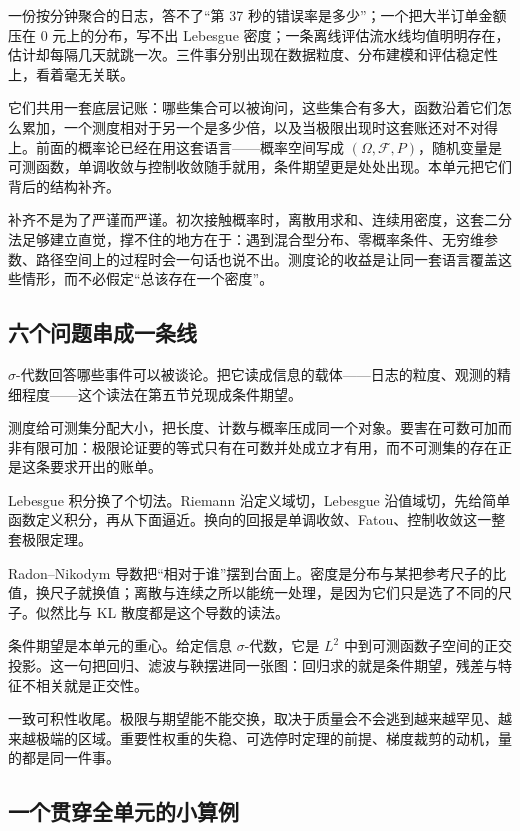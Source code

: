 一份按分钟聚合的日志，答不了``第 37 秒的错误率是多少''；一个把大半订单金额压在 0 元上的分布，写不出 Lebesgue 密度；一条离线评估流水线均值明明存在，估计却每隔几天就跳一次。三件事分别出现在数据粒度、分布建模和评估稳定性上，看着毫无关联。

它们共用一套底层记账：哪些集合可以被询问，这些集合有多大，函数沿着它们怎么累加，一个测度相对于另一个是多少倍，以及当极限出现时这套账还对不对得上。前面的概率论已经在用这套语言——概率空间写成 \((\Omega,\mathcal F,P)\)，随机变量是可测函数，单调收敛与控制收敛随手就用，条件期望更是处处出现。本单元把它们背后的结构补齐。

补齐不是为了严谨而严谨。初次接触概率时，离散用求和、连续用密度，这套二分法足够建立直觉，撑不住的地方在于：遇到混合型分布、零概率条件、无穷维参数、路径空间上的过程时会一句话也说不出。测度论的收益是让同一套语言覆盖这些情形，而不必假定``总该存在一个密度''。

\subsection{六个问题串成一条线}

\(\sigma\)-代数回答哪些事件可以被谈论。把它读成信息的载体——日志的粒度、观测的精细程度——这个读法在第五节兑现成条件期望。

测度给可测集分配大小，把长度、计数与概率压成同一个对象。要害在可数可加而非有限可加：极限论证要的等式只有在可数并处成立才有用，而不可测集的存在正是这条要求开出的账单。

Lebesgue 积分换了个切法。Riemann 沿定义域切，Lebesgue 沿值域切，先给简单函数定义积分，再从下面逼近。换向的回报是单调收敛、Fatou、控制收敛这一整套极限定理。

Radon--Nikodym 导数把``相对于谁''摆到台面上。密度是分布与某把参考尺子的比值，换尺子就换值；离散与连续之所以能统一处理，是因为它们只是选了不同的尺子。似然比与 KL 散度都是这个导数的读法。

条件期望是本单元的重心。给定信息 \(\sigma\)-代数，它是 \(L^2\) 中到可测函数子空间的正交投影。这一句把回归、滤波与鞅摆进同一张图：回归求的就是条件期望，残差与特征不相关就是正交性。

一致可积性收尾。极限与期望能不能交换，取决于质量会不会逃到越来越罕见、越来越极端的区域。重要性权重的失稳、可选停时定理的前提、梯度裁剪的动机，量的都是同一件事。

\subsection{一个贯穿全单元的小算例}

